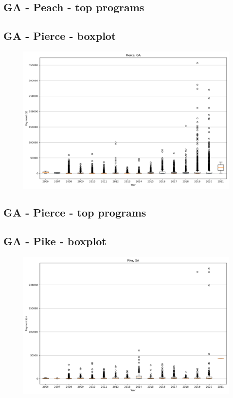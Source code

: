 \subsection*{GA - Peach - top programs}

\newpage
\subsection*{GA - Pierce - boxplot}
\begin{figure}[h]
\centering
\includegraphics[width=7in]{../output/boxplots/counties/Pierce-GA_boxplot.png}
\end{figure}


\subsection*{GA - Pierce - top programs}

\newpage
\subsection*{GA - Pike - boxplot}
\begin{figure}[h]
\centering
\includegraphics[width=7in]{../output/boxplots/counties/Pike-GA_boxplot.png}
\end{figure}



